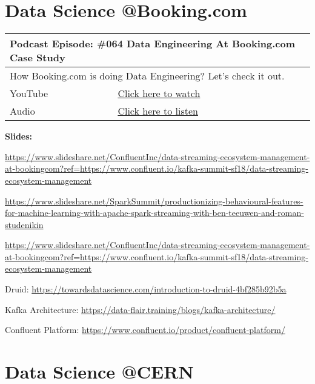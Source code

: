 \documentclass[12pt, numbers=noenddot]{scrreprt} %
\begin{document}
\section{Data Science @Booking.com}

\begin{table}[h]
\begin{tabular}{ll}
\hline
\multicolumn{2}{l}{\textbf{Podcast Episode:} \#064 Data Engineering At Booking.com Case Study} \\ \hline
\multicolumn{2}{p{15cm}}{How Booking.com is doing Data Engineering? Let's check it out.}         \\ \hline
\multicolumn{1}{l|}{YouTube}   & \href{https://youtu.be/9GE3yiVo1FM}{Click here to watch}   \\ 
\multicolumn{1}{l|}{Audio}     & \href{https://anchor.fm/andreaskayy/episodes/064-Data-Engineering-At-Booking-com-Case-Study-e45ilg}{Click here to listen}   \\ \hline
\end{tabular}
\end{table}

\textbf{Slides:}

\url{https://www.slideshare.net/ConfluentInc/data-streaming-ecosystem-management-at-bookingcom?ref=https://www.confluent.io/kafka-summit-sf18/data-streaming-ecosystem-management}

\url{https://www.slideshare.net/SparkSummit/productionizing-behavioural-features-for-machine-learning-with-apache-spark-streaming-with-ben-teeuwen-and-roman-studenikin}

\url{https://www.slideshare.net/ConfluentInc/data-streaming-ecosystem-management-at-bookingcom?ref=https://www.confluent.io/kafka-summit-sf18/data-streaming-ecosystem-management}

Druid:
\url{https://towardsdatascience.com/introduction-to-druid-4bf285b92b5a}

Kafka Architecture:
\url{https://data-flair.training/blogs/kafka-architecture/}

Confluent Platform:
\url{https://www.confluent.io/product/confluent-platform/}


\section{Data Science @CERN}
\end{document}
